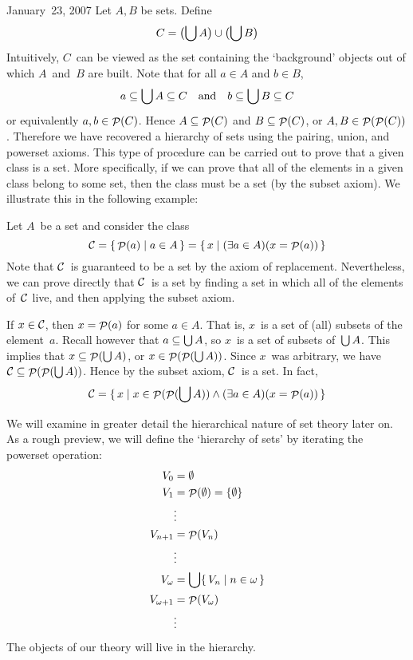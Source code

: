 \begin{lecture}{January~23, 2007}
Let \(A,B\) be sets. Define
\[C=\bigl(\bigcup A\bigr)\cup\bigl(\bigcup B\bigr)\]
Intuitively, \(C\)~can be viewed as the set containing the `background' objects out of which \(A\)~and~\(B\) are built. Note that for all \(a\in A\) and \(b\in B\),
\[a\subseteq\bigcup A\subseteq C\quad\text{and}\quad b\subseteq\bigcup B\subseteq C\]
or equivalently \(a,b\in\mathop{\mathcal{P}}(C)\). Hence \(A\subseteq\mathop{\mathcal{P}}(C)\) and \(B\subseteq\mathop{\mathcal{P}}(C)\), or \(A,B\in\mathop{\mathcal{P}}(\mathop{\mathcal{P}}(C))\). Therefore we have recovered a hierarchy of sets using the pairing, union, and powerset axioms. This type of procedure can be carried out to prove that a given class is a set. More specifically, if we can prove that all of the elements in a given class belong to some set, then the class must be a set (by the subset axiom). We illustrate this in the following example:
\begin{example}
Let \(A\)~be a set and consider the class
\[\mathcal{C}=\{\,\mathop{\mathcal{P}}(a)\mid a\in A\,\}=\{\,x\mid(\exists a\in A)(x=\mathop{\mathcal{P}}(a))\,\}\]
Note that \(\mathcal{C}\)~is guaranteed to be a set by the axiom of replacement. Nevertheless, we can prove directly that \(\mathcal{C}\)~is a set by finding a set in which all of the elements of~\(\mathcal{C}\) live, and then applying the subset axiom.

If \(x\in\mathcal{C}\), then \(x=\mathop{\mathcal{P}}(a)\) for some \(a\in A\). That is, \(x\)~is a set of (all) subsets of the element~\(a\). Recall however that \(a\subseteq\bigcup A\), so \(x\)~is a set of subsets of~\(\bigcup A\). This implies that \(x\subseteq\mathop{\mathcal{P}}(\bigcup A)\), or \(x\in\mathop{\mathcal{P}}(\mathop{\mathcal{P}}(\bigcup A))\). Since \(x\)~was arbitrary, we have \(\mathcal{C}\subseteq\mathop{\mathcal{P}}(\mathop{\mathcal{P}}(\bigcup A))\). Hence by the subset axiom, \(\mathcal{C}\)~is a set. In fact,
\[\mathcal{C}=\{\,x\mid x\in\mathop{\mathcal{P}}(\mathop{\mathcal{P}}(\bigcup A))\land(\exists a\in A)(x=\mathop{\mathcal{P}}(a))\,\}\]
\end{example}

We will examine in greater detail the hierarchical nature of set theory later on. As a rough preview, we will define the `hierarchy of sets' by iterating the powerset operation:
\begin{align*}
V_0&=\emptyset\\
V_1&=\mathop{\mathcal{P}}(\emptyset)=\{\emptyset\}\\
	&\vdots\\
V_{n+1}&=\mathop{\mathcal{P}}(V_n)\\
	&\vdots\\
V_{\omega}&=\bigcup\{\,V_n\mid n\in\omega\,\}\\
V_{\omega+1}&=\mathop{\mathcal{P}}(V_{\omega})\\
	&\vdots
\end{align*}
The objects of our theory will live in the hierarchy.


\end{lecture}

